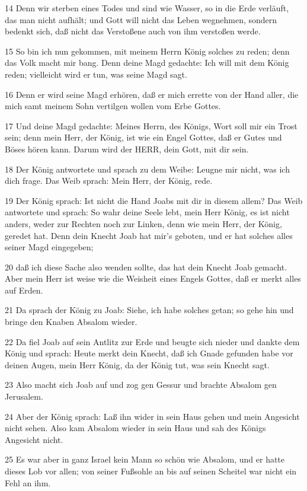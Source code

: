 \par 14 Denn wir sterben eines Todes und sind wie Wasser, so in die Erde verläuft, das man nicht aufhält; und Gott will nicht das Leben wegnehmen, sondern bedenkt sich, daß nicht das Verstoßene auch von ihm verstoßen werde.
\par 15 So bin ich nun gekommen, mit meinem Herrn König solches zu reden; denn das Volk macht mir bang. Denn deine Magd gedachte: Ich will mit dem König reden; vielleicht wird er tun, was seine Magd sagt.
\par 16 Denn er wird seine Magd erhören, daß er mich errette von der Hand aller, die mich samt meinem Sohn vertilgen wollen vom Erbe Gottes.
\par 17 Und deine Magd gedachte: Meines Herrn, des Königs, Wort soll mir ein Trost sein; denn mein Herr, der König, ist wie ein Engel Gottes, daß er Gutes und Böses hören kann. Darum wird der HERR, dein Gott, mit dir sein.
\par 18 Der König antwortete und sprach zu dem Weibe: Leugne mir nicht, was ich dich frage. Das Weib sprach: Mein Herr, der König, rede.
\par 19 Der König sprach: Ist nicht die Hand Joabs mit dir in diesem allem? Das Weib antwortete und sprach: So wahr deine Seele lebt, mein Herr König, es ist nicht anders, weder zur Rechten noch zur Linken, denn wie mein Herr, der König, geredet hat. Denn dein Knecht Joab hat mir's geboten, und er hat solches alles seiner Magd eingegeben;
\par 20 daß ich diese Sache also wenden sollte, das hat dein Knecht Joab gemacht. Aber mein Herr ist weise wie die Weisheit eines Engels Gottes, daß er merkt alles auf Erden.
\par 21 Da sprach der König zu Joab: Siehe, ich habe solches getan; so gehe hin und bringe den Knaben Absalom wieder.
\par 22 Da fiel Joab auf sein Antlitz zur Erde und beugte sich nieder und dankte dem König und sprach: Heute merkt dein Knecht, daß ich Gnade gefunden habe vor deinen Augen, mein Herr König, da der König tut, was sein Knecht sagt.
\par 23 Also macht sich Joab auf und zog gen Gessur und brachte Absalom gen Jerusalem.
\par 24 Aber der König sprach: Laß ihn wider in sein Haus gehen und mein Angesicht nicht sehen. Also kam Absalom wieder in sein Haus und sah des Königs Angesicht nicht.
\par 25 Es war aber in ganz Israel kein Mann so schön wie Absalom, und er hatte dieses Lob vor allen; von seiner Fußsohle an bis auf seinen Scheitel war nicht ein Fehl an ihm.
